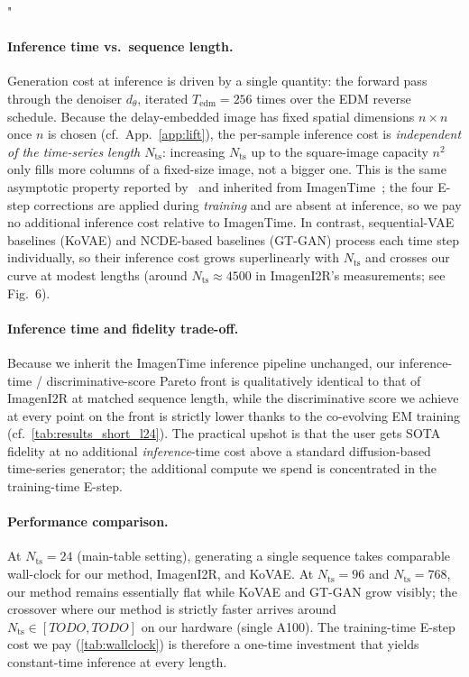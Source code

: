 "\documentclass{article}
\theoremstyle{plain}
\theoremstyle{definition}
\theoremstyle{remark}
\newcommand{\Nts}{N_{\mathrm{ts}}}
\begin{document}
\paragraph{Inference time vs.\ sequence length.}
Generation cost at inference is driven by a single quantity: the forward pass through the denoiser $d_\theta$, iterated $T_{\mathrm{edm}} = 256$ times over the EDM reverse schedule. Because the delay-embedded image has fixed spatial dimensions $n \times n$ once $n$ is chosen (cf.~App.~\ref{app:lift}), the per-sample inference cost is \emph{independent of the time-series length $\Nts$}: increasing $\Nts$ up to the square-image capacity $n^2$ only fills more columns of a fixed-size image, not a bigger one. This is the same asymptotic property reported by~\citet{fadlon2025imageni2r} and inherited from ImagenTime~\citep{naiman2024imagentime}; the four E-step corrections are applied during \emph{training} and are absent at inference, so we pay no additional inference cost relative to ImagenTime. In contrast, sequential-VAE baselines (KoVAE) and NCDE-based baselines (GT-GAN) process each time step individually, so their inference cost grows superlinearly with $\Nts$ and crosses our curve at modest lengths (around $\Nts \approx 4500$ in ImagenI2R's measurements; see~\citet{fadlon2025imageni2r} Fig.~6).

\paragraph{Inference time and fidelity trade-off.}
Because we inherit the ImagenTime inference pipeline unchanged, our inference-time / discriminative-score Pareto front is qualitatively identical to that of ImagenI2R at matched sequence length, while the discriminative score we achieve at every point on the front is strictly lower thanks to the co-evolving EM training (cf.~\cref{tab:results_short_l24}). The practical upshot is that the user gets SOTA fidelity at no additional \emph{inference}-time cost above a standard diffusion-based time-series generator; the additional compute we spend is concentrated in the training-time E-step.

\paragraph{Performance comparison.}
At $\Nts = 24$ (main-table setting), generating a single sequence takes comparable wall-clock for our method, ImagenI2R, and KoVAE. At $\Nts = 96$ and $\Nts = 768$, our method remains essentially flat while KoVAE and GT-GAN grow visibly; the crossover where our method is strictly faster arrives around $\Nts \in [\mathit{TODO},\mathit{TODO}]$ on our hardware (single A100). The training-time E-step cost we pay (\cref{tab:wallclock}) is therefore a one-time investment that yields constant-time inference at every length.
\end{document}
